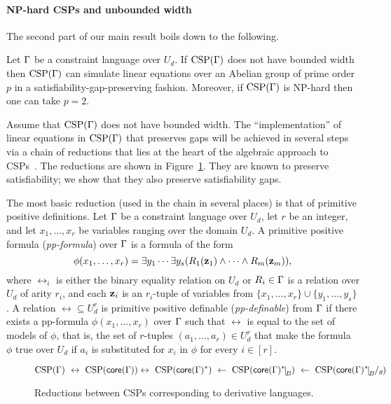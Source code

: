 \paragraph{NP-hard CSPs and unbounded width}

The second part of our main result boils down to the following.

\begin{theorem}\label{the:hsp-gap-o}
Let $\Gamma$ be a constraint language over $U_d$. 
If ${\rm CSP}(\Gamma)$ does not have bounded width then ${\rm CSP}(\Gamma)$ can simulate linear
  equations over an Abelian group of prime order $p$ in a
  satisfiability-gap-preserving fashion. Moreover, if ${\rm CSP}(\Gamma)$ is NP-hard
  then one can take $p=2$.
\end{theorem}


Assume that ${\rm CSP}(\Gamma)$ does not have bounded width. The ``implementation'' of
linear equations in ${\rm CSP}(\Gamma)$ that preserves gaps will be achieved
in several steps via a 
chain of reductions that lies at the heart of the algebraic approach to CSPs~\cite{Bulatov05:classifying}. 
%
The reductions are shown in Figure~\ref{fig:reductions-o}. They are
known to preserve satisfiability; we show that they also preserve satisfiability
gaps. 

The most basic reduction (used in the chain in several places) is that of
primitive positive definitions. 
%
Let $\Gamma$ be a constraint language over $U_d$, let $r$ be an integer, and
let $x_1,\ldots,x_r$ be variables ranging over the domain $U_d$. A primitive
positive formula (\emph{pp-formula}) over $\Gamma$ is a formula of the form
%
\begin{equation}\label{eq:pp-formula-o}
  \phi(x_1,\ldots,x_r)=\exists y_1\cdots\exists y_s(R_1({\bf z}_1)\wedge\cdots\wedge
  R_m({\bf z}_m)),
\end{equation}
%
where $\rel_i$ is either the binary equality relation on $U_d$ or $R_i\in\Gamma$ is a relation over $U_d$ of arity $r_i$, and each ${\bf z}_i$ is an $r_i$-tuple of variables from
$\{x_1,\ldots,x_r\}\cup\{y_1,\ldots,y_s\}$.
%
A relation $\rel\subseteq U_d^r$ is primitive positive definable
(\emph{pp-definable}) from $\Gamma$ if there
exists a pp-formula $\phi(x_1,\ldots,x_r)$ over $\Gamma$ such that $\rel$ is equal to the set of
models of $\phi$, that is, the set of $r$-tuples $(a_1,\ldots,a_r)\in U_d^r$
that make the formula $\phi$ true over $U_d$ if $a_i$ is
substituted for $x_i$ in $\phi$ for every $i\in [r]$.

\begin{figure}[t!]
\[
\CSP(\Gm)\ \leftrightarrow\ \CSP(\core(\Gm)) \leftrightarrow\ \CSP(\core(\Gm)^*)\ \leftarrow\ \CSP(\core(\Gm)^*\red B) \ \leftarrow\ \CSP(\core(\Gm)^*\red B\fac\th)
\]
\caption{Reductions between CSPs corresponding to derivative languages.}
\label{fig:reductions-o}
\end{figure}


